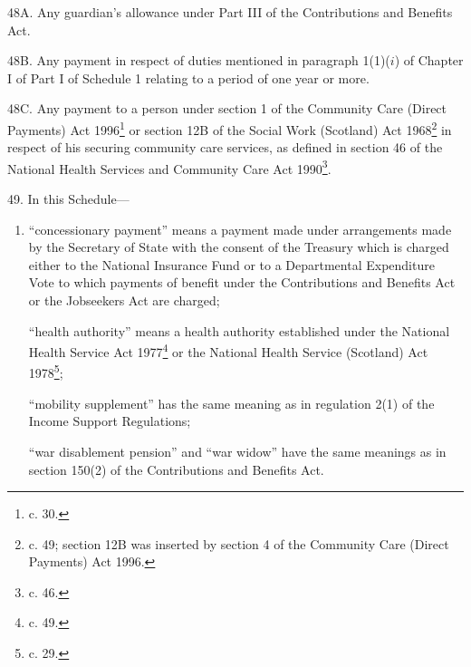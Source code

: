 \documentclass[12pt,a4paper]{article}
\begin{document}
\medskip


48A.  Any guardian’s allowance under Part III of the Contributions and Benefits Act. 


\medskip

48B. Any payment in respect of duties mentioned in paragraph 1(1)($i$) of Chapter I of Part I of Schedule 1 relating to a period of one year or more.


\medskip

48C.  Any payment to a person under section 1 of the Community Care (Direct Payments) Act 1996\footnote{ c. 30.} or section 12B of the Social Work (Scotland) Act 1968\footnote{ c. 49; section 12B was inserted by section 4 of the Community Care (Direct Payments) Act 1996.} in respect of his securing community care services, as defined in section 46 of the National Health Services and Community Care Act 1990\footnote{ c. 46.}.


\medskip

49.  In this Schedule—
\begin{enumerate}\item[]
“concessionary payment” means a payment made under arrangements made by the Secretary of State with the consent of the Treasury which is charged either to the National Insurance Fund or to a Departmental Expenditure Vote to which payments of benefit under the Contributions and Benefits Act 
or the Jobseekers Act  %
are charged;

“health authority” means a health authority established under the National Health Service Act 1977\footnote{ c. 49.} or the National Health Service (Scotland) Act 1978\footnote{ c. 29.};

“mobility supplement” has the same meaning as in regulation 2(1) of the Income Support Regulations;

“war disablement pension” and “war widow” have the same meanings as in section 150(2) of the Contributions and Benefits Act.
\end{enumerate}
\end{document}
